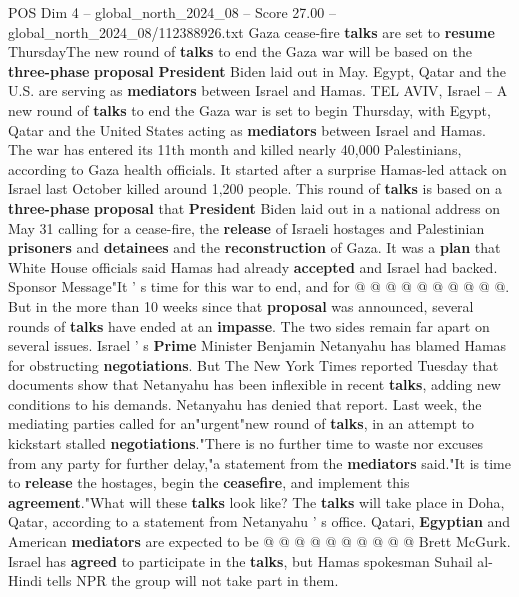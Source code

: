 \begin{textsample}{POS Dim 4 – global\_north\_2024\_08 – Score 27.00 – global\_north\_2024\_08/112388926.txt}  \label{ex:f4_pos_163}
Gaza cease-fire \textbf{talks} are set to \textbf{resume} ThursdayThe new round of \textbf{talks} to end the Gaza war will be based on the \textbf{three-phase} \textbf{proposal} \textbf{President} Biden laid out in May.
Egypt, Qatar and the U.S. are serving as \textbf{mediators} between Israel and Hamas.
TEL AVIV, Israel -- A new round of \textbf{talks} to end the Gaza war is set to begin Thursday, with Egypt, Qatar and the United States acting as \textbf{mediators} between Israel and Hamas.
The war has entered its 11th month and killed nearly 40,000 Palestinians, according to Gaza health officials.
It started after a surprise Hamas-led attack on Israel last October killed around 1,200 people.
This round of \textbf{talks} is based on a \textbf{three-phase} \textbf{proposal} that \textbf{President} Biden laid out in a national address on May 31 calling for a cease-fire, the \textbf{release} of Israeli hostages and Palestinian \textbf{prisoners} and \textbf{detainees} and the \textbf{reconstruction} of Gaza.
It was a \textbf{plan} that White House officials said Hamas had already \textbf{accepted} and Israel had backed.
Sponsor Message"It ' s time for this war to end, and for @ @ @ @ @ @ @ @ @ @.
But in the more than 10 weeks since that \textbf{proposal} was announced, several rounds of \textbf{talks} have ended at an \textbf{impasse}.
The two sides remain far apart on several issues.
Israel ' s \textbf{Prime} Minister Benjamin Netanyahu has blamed Hamas for obstructing \textbf{negotiations}.
But The New York Times reported Tuesday that documents show that Netanyahu has been inflexible in recent \textbf{talks}, adding new conditions to his demands.
Netanyahu has denied that report.
Last week, the mediating parties called for an"urgent"new round of \textbf{talks}, in an attempt to kickstart stalled \textbf{negotiations}."There is no further time to waste nor excuses from any party for further delay,"a statement from the \textbf{mediators} said."It is time to \textbf{release} the hostages, begin the \textbf{ceasefire}, and implement this \textbf{agreement}."What will these \textbf{talks} look like?
The \textbf{talks} will take place in Doha, Qatar, according to a statement from Netanyahu ' s office.
Qatari, \textbf{Egyptian} and American \textbf{mediators} are expected to be @ @ @ @ @ @ @ @ @ @ Brett McGurk.
Israel has \textbf{agreed} to participate in the \textbf{talks}, but Hamas spokesman Suhail al-Hindi tells NPR the group will not take part in them.

\end{textsample}
